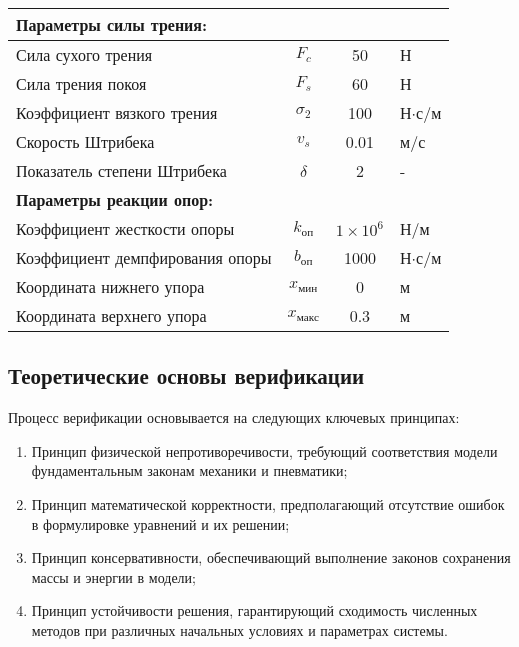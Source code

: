 \begin{table}[h]
\begin{tabular}{lccl}
        \midrule
        \multicolumn{4}{l}{\textbf{Параметры силы трения:}}                                                                         \\
        \midrule
        Сила сухого трения               & $F_c$                                     & 50                    & Н                    \\
        Сила трения покоя                & $F_s$                                     & 60                    & Н                    \\
        Коэффициент вязкого трения       & $\sigma_2$                                & 100                   & Н$\cdot$с/м          \\
        Скорость Штрибека                & $v_s$                                     & 0.01                  & м/с                  \\
        Показатель степени Штрибека      & $\delta$                                  & 2                     & -                    \\
        \midrule
        \multicolumn{4}{l}{\textbf{Параметры реакции опор:}}                                                                        \\
        \midrule
        Коэффициент жесткости опоры      & $k_\text{оп}$                             & $1 \times 10^6$       & Н/м                  \\
        Коэффициент демпфирования опоры  & $b_\text{оп}$                             & 1000                  & Н$\cdot$с/м          \\
        Координата нижнего упора         & $x_\text{мин}$                            & 0                     & м                    \\
        Координата верхнего упора        & $x_\text{макс}$                           & 0.3                   & м                    \\
        \midrule
    \end{tabular}
    \label{tab:ch2/extended_parameters}
\end{table}

\subsection{Теоретические основы верификации}\label{sec:ch2/sec7/subsec1}
Процесс верификации основывается на следующих ключевых принципах:

\begin{enumerate}
    \item Принцип физической непротиворечивости, требующий соответствия модели фундаментальным законам механики и пневматики;
    \item Принцип математической корректности, предполагающий отсутствие ошибок в формулировке уравнений и их решении;
    \item Принцип консервативности, обеспечивающий выполнение законов сохранения массы и энергии в модели;
    \item Принцип устойчивости решения, гарантирующий сходимость численных методов при различных начальных условиях и параметрах системы.
\end{enumerate}

